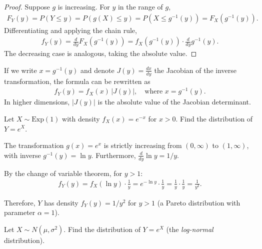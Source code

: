 \begin{proof}
Suppose $g$ is increasing. For $y$ in the range of $g$,
\begin{align}
 F_Y(y) = P(Y \leq y) = P(g(X) \leq y) = P(X \leq g^{-1}(y)) = F_X(g^{-1}(y)).
\end{align}
Differentiating and applying the chain rule,
\begin{align}
 f_Y(y) = \frac{d}{dy} F_X(g^{-1}(y)) = f_X(g^{-1}(y)) \cdot \frac{d}{dy} g^{-1}(y).
\end{align}
The decreasing case is analogous, taking the absolute value.
\end{proof}

\begin{observacion}
If we write $x = g^{-1}(y)$ and denote $J(y) = \frac{dx}{dy}$ the Jacobian of the inverse transformation, the formula can be rewritten as
\begin{align}
 \label{eq:3.2.4}
 f_Y(y) = f_X(x)\,|J(y)|, \quad \text{where } x = g^{-1}(y).
\end{align}
In higher dimensions, $|J(y)|$ is the absolute value of the Jacobian determinant.
\end{observacion}

\begin{ejemplo}
 \label{exmp:3.2.2}
Let $X \sim \text{Exp}(1)$ with density $f_X(x) = e^{-x}$ for $x > 0$. Find the distribution of $Y = e^X$.
\end{ejemplo}

\begin{solucion}
The transformation $g(x) = e^x$ is strictly increasing from $(0, \infty)$ to $(1, \infty)$, with inverse $g^{-1}(y) = \ln y$. Furthermore, $\frac{d}{dy}\ln y = 1/y$.

By the change of variable theorem, for $y > 1$:
\begin{align}
 f_Y(y) = f_X(\ln y) \cdot \frac{1}{y} = e^{-\ln y} \cdot \frac{1}{y} = \frac{1}{y} \cdot \frac{1}{y} = \frac{1}{y^2}.
\end{align}

Therefore, $Y$ has density $f_Y(y) = 1/y^2$ for $y > 1$ (a Pareto distribution with parameter $\alpha = 1$).
\end{solucion}

\begin{ejemplo}
 \label{exmp:3.2.3}
Let $X \sim N(\mu, \sigma^2)$. Find the distribution of $Y = e^X$ (the \emph{log-normal} distribution).
\end{ejemplo}

